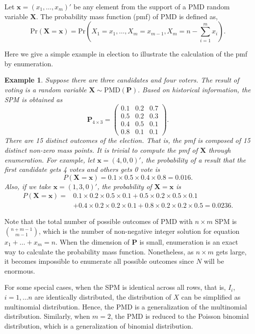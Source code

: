 \documentclass[12pt]{article}
\newcommand{\Pmat}{\mathbf{P}}
\newcommand{\PMD}{\textrm{PMD}}
\newcommand{\Xvec}{\boldsymbol{X}}
\newcommand{\xvec}{\boldsymbol{x}}
\newcommand{\qedw}{\hfill \ensuremath{\Box}}
\newtheorem{example}{Example}
\begin{document}
Let $\xvec = (x_1,\dots,x_m)'$ be any element from the support of a $\PMD$ random variable $\Xvec$. The probability mass function (pmf) of PMD is defined as,
$$\text{Pr}(\Xvec=\xvec) = \text{Pr} \left( X_1 = x_1, \dots, X_m = x_{m-1}, X_{m} = n-\sum_{i=1}^{m}x_i \right).$$

Here we give a simple example in election to illustrate the calculation of the pmf by enumeration.
\begin{example}%
Suppose there are three candidates and four voters. The result of voting is a random variable $\Xvec \sim \PMD(\Pmat)$. Based on historical information, the SPM is obtained as
\begin{equation*}
\Pmat_{4 \times 3} = \begin{pmatrix}
0.1 &  0.2 & 0.7\\
0.5 & 0.2 & 0.3\\
0.4 &  0.5 & 0.1\\
0.8 & 0.1 & 0.1
\end{pmatrix}.
\end{equation*}
There are 15 distinct outcomes of the election. That is, the pmf is composed of 15 distinct non-zero mass points. It is trivial to compute the pmf of $\Xvec$ through enumeration. For example, let $\xvec =  (4,0,0)'$, the probability of a result that the first candidate gets 4 votes and others gets 0 vote is
\begin{equation*}
P\left( \Xvec = \xvec \right) = 0.1\times 0.5 \times 0.4 \times 0.8 = 0.016.
\end{equation*}
Also, if we take $\xvec=(1,3,0)'$, the probability of $\Xvec = \xvec$ is
\begin{align*}
P\left( \Xvec = \xvec \right)  =  & 0.1\times 0.2 \times 0.5 \times 0.1 +
 0.5\times0.2\times0.5 \times 0.1 \\
 & + 0.4\times0.2\times0.2\times0.1 + 0.8\times0.2\times0.2\times0.5 = 0.0236.
\end{align*}
\end{example}

Note that the total number of possible outcomes of $\PMD$ with $n \times m$ SPM is $\binom{n+m-1}{m-1}$, which is the number of non-negative integer solution for equation $x_1 + \dots + x_m = n$. When the dimension of $\Pmat$ is small, enumeration is an exact way to calculate the probability mass function. Nonetheless, as $n \times m$ gets large, it becomes impossible to enumerate all possible outcomes since $N$ will be enormous.

For some special cases, when the SPM is identical across all rows, that is, $I_{i}$, $i = 1, \dots n$ are identically distributed, the distribution of $X$ can be simplified as multinomial distribution. Hence, the $\PMD$ is a generalization of the multinomial distribution. Similarly, when $m=2$, the $\PMD$ is reduced to the Poisson binomial distribution, which is a generalization of binomial distribution.
\end{document}
